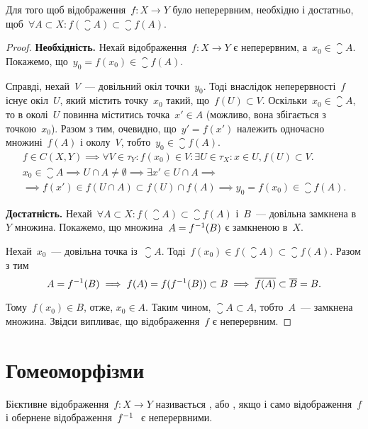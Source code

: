 \begin{theorem}
    Для того щоб відображення~$f: X \to Y$ було неперервним, необхідно і достатньо, щоб~$\forall A \subset X: f(\closure{A}) \subset \closure{f(A)}$.
\end{theorem}

\begin{proof}
    \textbf{Необхідність.} Нехай відображення~$f: X \to Y$ є неперервним, а~$x_0 \in \closure{A}$. Покажемо, що~$y_0 = f(x_0) \in \closure{f(A)}$.

    Справді, нехай~$V$~--- довільний окіл точки~$y_0$. Тоді внаслідок неперервності~$f$ існує окіл~$U$, який містить точку~$x_0$ такий, що~$f(U) \subset V$. Оскільки~$x_0 \in \closure{A}$, то в околі~$U$ повинна міститись точка~$x' \in A$ (можливо, вона збігається з точкою~$x_0$). Разом з тим, очевидно, що~$y' = f(x')$ належить одночасно множині~$f(A)$ і околу~$V$, тобто~$y_0 \in \closure{f(A)}$.
    \begin{multline*}
        f \in C(X, Y) \implies \forall V \in \tau_Y: f(x_0) \in V: \exists U \in \tau_X: x \in U, f(U) \subset V. \\
        x_0 \in \closure{A} \implies U \cap A \ne \emptyset \implies \exists x' \in U \cap A \implies \\
        \implies f(x') \in f(U \cap A) \subset f(U) \cap f(A) \implies y_0 = f(x_0) \in \closure{f(A)}.
    \end{multline*}

    \textbf{Достатність.} Нехай~$\forall A \subset X: f(\closure{A}) \subset \closure{f(A)}$ і~$B$~--- довільна замкнена в~$Y$ множина. Покажемо, що множина~$A = f^{-1}(B)$ є замкненою в~$X$.

    Нехай~$x_0$~--- довільна точка із~$\closure{A}$. Тоді~$f(x_0) \in f(\closure{A}) \subset \closure{f(A)}$. Разом з тим
    \[ A = f^{-1}(B) \implies f(A) = f(f^{-1}(B)) \subset B \implies \overline{f(A)} \subset \overline{B} = B. \]

    Тому~$f(x_0) \in B$, отже, $x_0 \in A$. Таким чином, $\closure{A} \subset A$, тобто~$A$~--- замкнена множина. Звідси випливає, що відображення~$f$ є неперервним.
\end{proof}

\section{Гомеоморфізми}

\begin{definition}
    Бієктивне відображення~$f: X \to Y$ називається , або , якщо і само відображення~$f$ і обернене відображення~$f^{-1}~$ є неперервними.
\end{definition}

